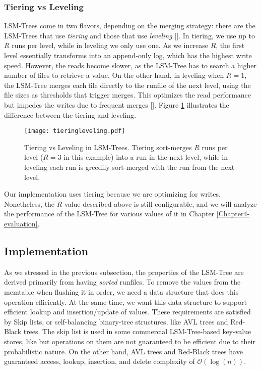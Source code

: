 \subsubsection{Tiering vs Leveling}

LSM-Trees come in two flavors, depending on the merging strategy: there are the LSM-Trees that use \textit{tiering} and those that use \textit{leveling} [\cite{compactionary}]. In tiering, we use up to $R$ runs per level, while in leveling we only use one.
As we increase $R$, the first level essentially transforms into an append-only log, which has the highest write speed. However, the reads become slower, as the LSM-Tree has to search a higher number of files to retrieve a value. On the other hand, in leveling when $R=1$, the LSM-Tree merges each file directly to the runfile of the next level, using the file sizes as thresholds that trigger merges. This optimizes the read performance but impedes the writes due to frequent merges [\cite{lsm-design-space}]. Figure \ref{fig:tiering-leveling} illustrates the difference between the tiering and leveling.

\vspace{20px}
\begin{figure}[h]
    \centering
    \texttt{[image: tieringleveling.pdf]}
    \caption{Tiering vs Leveling in LSM-Trees. Tiering sort-merges $R$ runs per level ($R=3$ in this example) into a run in the next level, while in leveling each run is greedily sort-merged with the run from the next level.}
    \label{fig:tiering-leveling}
\end{figure}
\vspace{20px}

Our implementation uses tiering because we are optimizing for writes. Nonetheless, the $R$ value described above is still configurable, and we will analyze the performance of the LSM-Tree for various values of it in Chapter \ref{Chapter4-evaluation}.

\subsection{Implementation}

As we stressed in the previous subsection, the properties of the LSM-Tree are derived primarily from having \textit{sorted} runfiles.
To remove the values from the memtable when flushing it in order, we need a data structure that does this operation efficiently.
At the same time, we want this data structure to support efficient lookup and insertion/update of values.
These requirements are satisfied by Skip lists, or self-balancing binary-tree structures, like AVL trees and Red-Black trees. The skip list is used in some commercial LSM-Tree-based key-value stores, like \cite{leveldb} but operations on them are not guaranteed to be efficient due to their probabilistic nature. On the other hand, AVL trees and Red-Black trees have guaranteed access, lookup, insertion, and delete complexity of $\mathcal{O}(\log{}(n))$.

